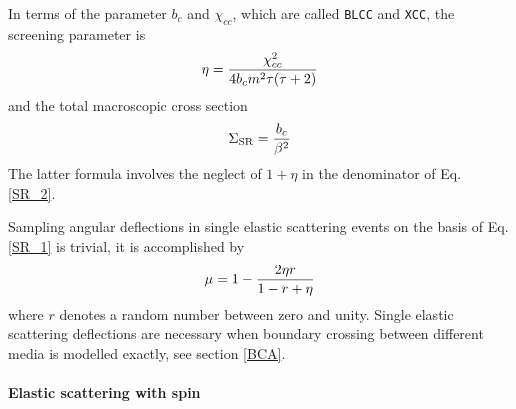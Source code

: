 In terms of the parameter $b_c$ and $\chi_{cc}$,
which are called {\tt BLCC} and {\tt XCC},
the screening parameter is
\begin{equation}
\label{calc_eta}
\eta = {\chi_{cc}^2 \over 4 b_c m^2 \tau (\tau + 2)}
\end{equation}
and the total macroscopic cross section
\begin{equation}
\label{SR_tot}
\Sigma_{\rm SR} = {b_c \over \beta^2}
\end{equation}
The latter formula involves the neglect of $1 + \eta$ in the denominator
of Eq. \eqref{SR_2}.

Sampling angular deflections in single elastic scattering events
on the basis of Eq. \eqref{SR_1} is trivial, it is accomplished by
\begin{equation}
\label{sample_SR}
\mu = 1 - {2 \eta r \over 1 - r + \eta}
\end{equation}
where $r$ denotes a random number between zero and unity.
Single elastic scattering deflections are necessary when
boundary crossing between different media is modelled exactly,
see section \ref{BCA}.

\paragraph{Elastic scattering with spin} \hfill
\label{spin_elastic}

